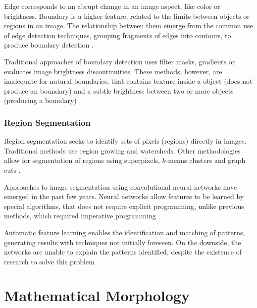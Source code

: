 Edge corresponds to an abrupt change in an image aspect, like color or brightness.
Boundary is a higher feature, related to the limits between objects or regions in an image.
The relationship between them emerge from the common use of edge detection techniques, grouping fragments of edges into contours, to produce boundary detection \cite{MARTIN:1273918}.

Traditional approaches of boundary detection uses filter masks, gradients or evaluates image brightness discontinuities.
These methods, however, are inadequate for natural boundaries, that contains texture inside a object (does not produce an boundary) and 
a subtle brightness between two or more objects (producing a boundary) \cite{MARTIN:1273918} \cite[Ch. 10]{gonzalez2002digital}.


\subsubsection{Region Segmentation}
\label{cap3_redes_neurais_seg}

Region segmentation seeks to identify sets of pixels (regions) directly in images.
Traditional methods use region growing and watersheds.
Other methodologies allow for segmentation of regions using superpixels, $k$-means clusters and graph cuts \cite{pedrini2008analise}.

Approaches to image segmentation using convolutional neural networks have emerged in the past few years.
Neural networks allow features to be learned by special algorithms, that does not require explicit programming, unlike previous methods, which required imperative programming \cite{Segnet:2017:7803544}.

Automatic feature learning enables the identification and matching of patterns, generating results with techniques not initially foreseen.
On the downside, the networks are unable to explain the patterns identified, despite the existence of research to solve this problem \cite{Segnet:2017:7803544} \cite{Yosinski:2015}.

\section{Mathematical Morphology}
\label{cap3_morf_matematica}


